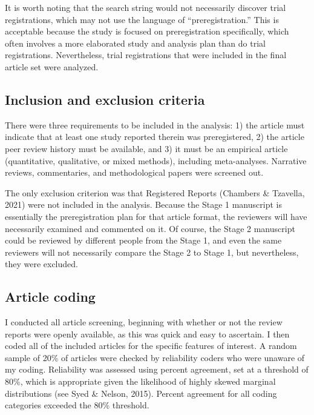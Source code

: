 \documentclass[authordate, meta]{jote-new-article}
\begin{document}
	It is worth noting that the search string would not necessarily discover trial registrations, which may not use the language of “preregistration.” This is acceptable because the study is focused on preregistration specifically, which often involves a more elaborated study and analysis plan than do trial registrations. Nevertheless, trial registrations that were included in the final article set were analyzed.



	\subsection{Inclusion and exclusion criteria}



	There were three requirements to be included in the analysis: 1) the article must indicate that at least one study reported therein was preregistered, 2) the article peer review history must be available, and 3) it must be an empirical article (quantitative, qualitative, or mixed methods), including meta-analyses. Narrative reviews, commentaries, and methodological papers were screened out.



	The only exclusion criterion was that Registered Reports (Chambers \& Tzavella, 2021) were not included in the analysis. Because the Stage 1 manuscript is essentially the preregistration plan for that article format, the reviewers will have necessarily examined and commented on it. Of course, the Stage 2 manuscript could be reviewed by different people from the Stage 1, and even the same reviewers will not necessarily compare the Stage 2 to Stage 1, but nevertheless, they were excluded.



	\subsection{Article coding}



	I conducted all article screening, beginning with whether or not the review reports were openly available, as this was quick and easy to ascertain. I then coded all of the included articles for the specific features of interest. A random sample of 20\% of articles were checked by reliability coders who were unaware of my coding. Reliability was assessed using percent agreement, set at a threshold of 80\%, which is appropriate given the likelihood of highly skewed marginal distributions (see Syed \& Nelson, 2015). Percent agreement for all coding categories exceeded the 80\% threshold.
\end{document}
